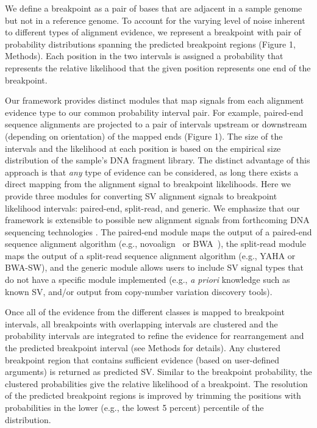 \documentclass[10pt]{bmc_article}
\newenvironment{bmcformat}{\begin{raggedright}\baselineskip20pt\sloppy\setboolean{publ}{false}}{\end{raggedright}\baselineskip20pt\sloppy}
\begin{document}
\begin{bmcformat}
We define a breakpoint as a pair of bases that are adjacent in a sample genome
but not in a reference genome. To account for the varying level of noise
inherent to different types of alignment evidence, we represent a breakpoint
with pair of probability distributions spanning the predicted breakpoint regions
(Figure 1, Methods). Each position in the two intervals is assigned a
probability that represents the relative likelihood that the given position
represents one end of the breakpoint.

Our framework provides distinct modules that map signals from each alignment
evidence type to our common probability interval pair.  For example, paired-end
sequence alignments are projected to a pair of intervals upstream or downstream
(depending on orientation) of the mapped ends (Figure 1).  The size of the
intervals and the likelihood at each position is based on the empirical size
distribution of the sample's DNA fragment library.  The distinct advantage of
this approach is that \emph{any} type of evidence can be considered, as long
there exists a direct mapping from the alignment signal to breakpoint
likelihoods.  Here we provide three modules for converting SV alignment signals
to breakpoint likelihood intervals: paired-end, split-read, and generic.  We
emphasize that our framework is extensible to possible new alignment signals
from forthcoming DNA sequencing technologies \cite{clarke2009}. The paired-end
module maps the output of a paired-end sequence alignment algorithm
(e.g., novoalign~\cite{hercus2013} or BWA~\cite{li2009a}), the split-read module
maps the output of a split-read sequence alignment algorithm (e.g.,
YAHA\cite{faust2012} or BWA-SW\cite{li2010}), and the generic module allows
users to include SV signal types that do not have a specific module implemented
(e.g., \emph{a priori} knowledge such as known SV, and/or output from
copy-number variation discovery tools).

Once all of the evidence from the different classes is mapped to breakpoint
intervals, all breakpoints with overlapping intervals are clustered and
the probability intervals are integrated to refine the evidence for
rearrangement and the predicted breakpoint interval (see Methods for details). 
Any clustered breakpoint region that contains sufficient evidence (based on
user-defined arguments) is returned as predicted SV. 
Similar to the breakpoint probability, the clustered probabilities give the
relative likelihood of a breakpoint.  The resolution of the predicted breakpoint
regions is improved by trimming the positions with probabilities
in the lower (e.g., the lowest 5 percent) percentile of the distribution.


\end{bmcformat}
\end{document}
